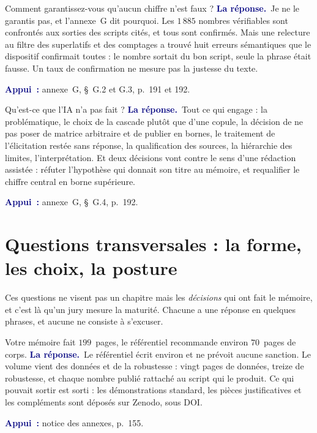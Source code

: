 \documentclass[11pt,a4paper]{article}
\newcommand{\rep}[1]{\smallskip\noindent\textcolor{navy}{\textbf{La réponse.}}\ #1\par}
\newcommand{\appui}[1]{\smallskip\noindent\small\textcolor{navy}{\textbf{Appui~:}} #1\par\normalsize}
\begin{document}
\begin{question}{\og Comment garantissez-vous qu'aucun chiffre n'est faux ?\fg{}}
\rep{Je ne le garantis pas, et l'annexe~G dit pourquoi. Les $1\,885$ nombres vérifiables sont
confrontés aux sorties des scripts cités, et tous sont confirmés. Mais une relecture au filtre des
superlatifs et des comptages a trouvé huit erreurs sémantiques que le dispositif confirmait
toutes : le nombre sortait du bon script, seule la phrase était fausse. Un taux de confirmation ne
mesure pas la justesse du texte.}
\appui{annexe~G, \S~G.2 et G.3, p.~191 et 192.}
\end{question}

\begin{question}{\og Qu'est-ce que l'IA n'a pas fait ?\fg{}}
\rep{Tout ce qui engage : la problématique, le choix de la cascade plutôt que d'une copule, la
décision de ne pas poser de matrice arbitraire et de publier en bornes, le traitement de
l'élicitation restée sans réponse, la qualification des sources, la hiérarchie des limites,
l'interprétation. Et deux décisions vont contre le sens d'une rédaction assistée : réfuter
l'hypothèse qui donnait son titre au mémoire, et requalifier le chiffre central en borne
supérieure.}
\appui{annexe~G, \S~G.4, p.~192.}
\end{question}

\section*{Questions transversales : la forme, les choix, la posture}

\noindent Ces questions ne visent pas un chapitre mais les \emph{décisions} qui ont fait le mémoire,
et c'est là qu'un jury mesure la maturité. Chacune a une réponse en quelques phrases, et aucune ne
consiste à s'excuser.

\begin{question}{\og Votre mémoire fait $199$~pages, le référentiel recommande environ $70$~pages de corps.\fg{}}
\rep{Le référentiel écrit \og environ\fg{} et ne prévoit aucune sanction. Le volume vient des données et
de la robustesse : vingt pages de données, treize de robustesse, et chaque nombre publié rattaché au
script qui le produit. Ce qui pouvait sortir est sorti : les démonstrations standard, les pièces
justificatives et les compléments sont déposés sur Zenodo, sous DOI.}
\appui{notice des annexes, p.~155.}
\end{question}
\end{document}
